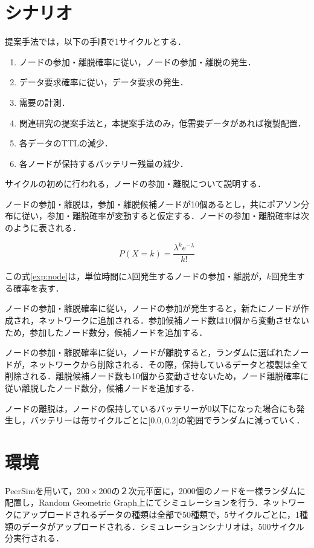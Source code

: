 \documentclass[11pt]{jreport}
\begin{document}
\section{シナリオ}
提案手法では，以下の手順で1サイクルとする．

\begin{enumerate}
	\item ノードの参加・離脱確率に従い，ノードの参加・離脱の発生．
	\item データ要求確率に従い，データ要求の発生．
	\item 需要の計測．
	\item 関連研究の提案手法と，本提案手法のみ，低需要データがあれば複製配置．
	\item 各データのTTLの減少．
	\item 各ノードが保持するバッテリー残量の減少．
\end{enumerate}

サイクルの初めに行われる，ノードの参加・離脱について説明する．
\par ノードの参加・離脱は，参加・離脱候補ノードが10個あるとし，共にポアソン分布に従い，参加・離脱確率が変動すると仮定する．ノードの参加・離脱確率は次のように表される．

\begin{equation}
P(X=k)=\frac{\lambda^{k}e^{-\lambda}}{k!} \label{exp:node}
\end{equation}

この式\ref{exp:node}は，単位時間に$\lambda$回発生するノードの参加・離脱が，$k$回発生する確率を表す．
\par ノードの参加・離脱確率に従い，ノードの参加が発生すると，新たにノードが作成され，ネットワークに追加される．参加候補ノード数は10個から変動させないため，参加したノード数分，候補ノードを追加する．
\par ノードの参加・離脱確率に従い，ノードが離脱すると，ランダムに選ばれたノードが，ネットワークから削除される．その際，保持しているデータと複製は全て削除される．離脱候補ノード数も10個から変動させないため，ノード離脱確率に従い離脱したノード数分，候補ノードを追加する．
\par ノードの離脱は，ノードの保持しているバッテリーが0以下になった場合にも発生し，バッテリーは毎サイクルごとに[$0.0, 0.2$]の範囲でランダムに減っていく．

\section{環境}
PeerSimを用いて，$200 \times 200$の２次元平面に，2000個のノードを一様ランダムに配置し，Random Geometric Graph上にてシミュレーションを行う．ネットワークにアップロードされるデータの種類は全部で50種類で，5サイクルごとに，1種類のデータがアップロードされる．シミュレーションシナリオは，500サイクル分実行される．
\end{document}
